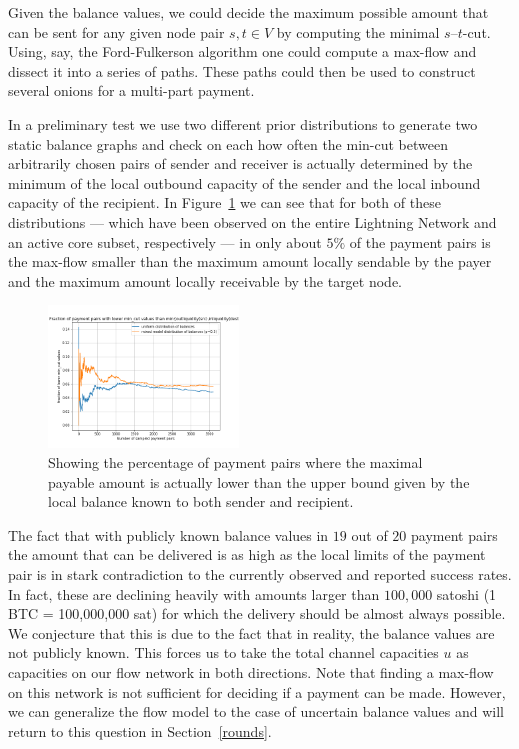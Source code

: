 \documentclass[10pt,twocolumn]{article}
\begin{document}
Given the balance values, we could decide the maximum possible amount that can be sent for any given node pair $s,t \in V$ by computing the minimal $s$--$t$-cut.
Using, say, the Ford-Fulkerson algorithm\cite{ford_fulkerson_1956} one could compute a max-flow and dissect it into a series of paths.
These paths could then be used to construct several onions for a multi-part payment.

In a preliminary test we use two different prior distributions to generate two static balance graphs and check on each how often the min-cut between arbitrarily chosen pairs of sender and receiver is actually determined by the minimum of the local outbound capacity of the sender and the local inbound capacity of the recipient.
In Figure~\ref{fig:mincut} we can see that for both of these distributions --- which have been observed on the entire Lightning Network and an active core subset, respectively --- in only about $5\%$ of the payment pairs is the max-flow smaller than the maximum amount locally sendable by the payer and the maximum amount locally receivable by the target node.
\begin{figure}[htpb]
  \center
  \includegraphics[width=0.45\textwidth]{img/maxFlowFraction.png}
  \caption{Showing the percentage of payment pairs where the maximal payable amount is actually lower than the upper bound given by the local balance known to both sender and recipient.}
  \label{fig:mincut}
\end{figure}

The fact that with publicly known balance values in $19$ out of $20$ payment pairs the amount that can be delivered is as high as the local limits of the payment pair is in stark contradiction to the currently observed and reported \cite{DBLP:journals/corr/abs-1911-09432,DBLP:journals/corr/abs-2006-14358,lange2021impact, pickhardt2021security} success rates. In fact, these are declining heavily with amounts larger than $100,000$ satoshi (1 BTC = 100,000,000 sat) for which the delivery should be almost always possible.
We conjecture that this is due to the fact that in reality, the balance values are not publicly known.
This forces us to take the total channel capacities $u$ as capacities on our flow network in both directions.
Note that finding a max-flow on this network is not sufficient for deciding if a payment can be made.
However, we can generalize the flow model to the case of uncertain balance values and will return to this question in Section~\ref{rounds}.
\end{document}
